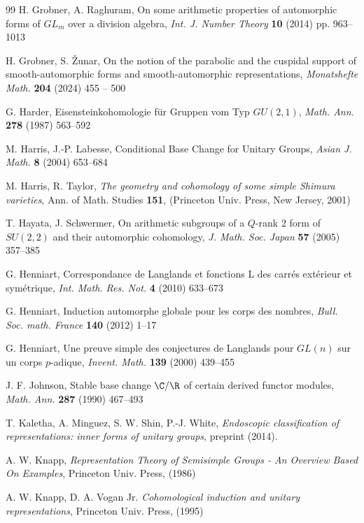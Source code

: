 \begin{thebibliography}{99}
 H. Grobner, A. Raghuram, On some arithmetic properties of automorphic forms of $GL_m$ over a division algebra, {\it Int. J. Number Theory} {\bf 10} (2014) pp. 963--1013


 H. Grobner, S. \v Zunar, On the notion of the parabolic and the cuspidal support of smooth-automorphic forms and smooth-automorphic representations, {\it Monatshefte Math.} {\bf 204} (2024) 455 -- 500 


 G. Harder, Eisensteinkohomologie für Gruppen vom Typ $GU(2,1)$, {\it Math. Ann.} {\bf 278} (1987) 563--592


 M. Harris, J.-P. Labesse, Conditional Base Change for Unitary Groups, {\it Asian J. Math.} {\bf 8} (2004) 653--684


 M. Harris, R. Taylor, {\it The geometry and cohomology of some simple Shimura varieties}, Ann. of Math. Studies {\bf 151}, (Princeton Univ. Press, New Jersey, 2001)


 T. Hayata, J. Schwermer, On arithmetic subgroups of a $Q$-rank 2 form of $SU(2,2)$ and their automorphic cohomology, {\it J. Math. Soc. Japan} {\bf 57} (2005) 357--385 


 G. Henniart, Correspondance de Langlands et fonctions L des carr\'es ext\'erieur et sym\'etrique, {\it Int. Math. Res. Not.}  {\bf 4} (2010) 633--673

 G. Henniart, Induction automorphe globale pour les corps des nombres, {\it Bull. Soc. math. France} {\bf 140} (2012) 1--17

 G. Henniart, Une preuve simple des conjectures de Langlands pour $GL(n)$ sur un corps $p$-adique, {\it Invent. Math.} \textbf{139} (2000) 439--455

 J. F. Johnson, Stable base change $\C/\R$ of certain derived functor modules, {\it Math. Ann.} {\bf 287} (1990) 467--493

 T. Kaletha, A. Minguez, S. W. Shin, P.-J. White, {\it Endoscopic classification of representations: inner forms of unitary groups}, preprint (2014).

 A. W. Knapp, \emph{Representation Theory of Semisimple Groups - An Overview Based On Examples}, Princeton Univ. Press, (1986)


 A. W. Knapp, D. A. Vogan Jr. \emph{Cohomological induction and unitary representations}, Princeton Univ. Press, (1995)


\end{thebibliography}
